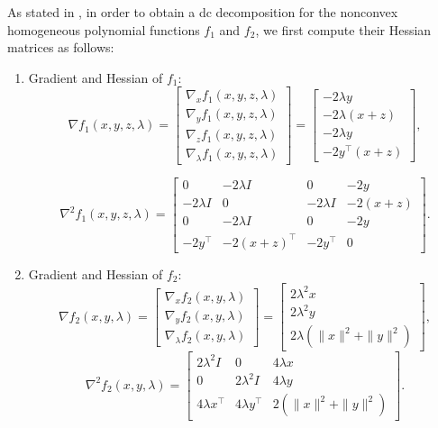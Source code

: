 \documentclass[3p]{elsarticle}
\begin{document}
As stated in \cite{Niu15,Niu11}, in order to obtain a dc decomposition for the nonconvex homogeneous polynomial functions $f_1$ and $f_2$, we first compute their Hessian matrices as follows:
\begin{enumerate}
	\item Gradient and Hessian of $f_1$:
	\[
	\nabla f_1(x,y,z,\lambda) = \begin{bmatrix}
	\nabla_x f_1(x,y,z,\lambda)\\
	\nabla_y f_1(x,y,z,\lambda)\\
	\nabla_z f_1(x,y,z,\lambda)\\
	\nabla_\lambda f_1(x,y,z,\lambda)
	\end{bmatrix} = \begin{bmatrix}
	-2\lambda y  \\
	-2\lambda (x+z)\\
	-2\lambda y\\
	-2y^{\top}(x+z)
	\end{bmatrix},
	\]
	
	\[\nabla^2 f_1(x,y,z,\lambda) = \begin{bmatrix}
	0 & -2\lambda I & 0 & -2y \\
	-2\lambda I & 0 & -2\lambda I & -2(x+z) \\
	0 & -2\lambda I & 0 & -2y \\
	-2y^{\top} & -2(x+z)^{\top} & -2y^{\top} & 0
	\end{bmatrix}.
	\]
	\item Gradient and Hessian of $f_2$:
	\[
	\nabla f_2(x,y,\lambda) = \begin{bmatrix}
	\nabla_x f_2(x,y,\lambda)\\
	\nabla_y f_2(x,y,\lambda)\\
	\nabla_\lambda f_2(x,y,\lambda)
	\end{bmatrix} = \begin{bmatrix}
	2\lambda^2 x\\
	2\lambda^2 y\\
	2\lambda(\|x\|^2+\|y\|^2)
	\end{bmatrix},
	\]
	\[\nabla^2 f_2(x,y,\lambda) = \begin{bmatrix}
	2\lambda^2 I & 0 & 4\lambda x \\
	0 & 2\lambda^2 I & 4\lambda y \\
	4\lambda x^{\top} & 4\lambda y^{\top} & 2(\|x\|^2+\|y\|^2)
	\end{bmatrix}.
	\]	
\end{enumerate}
\end{document}
